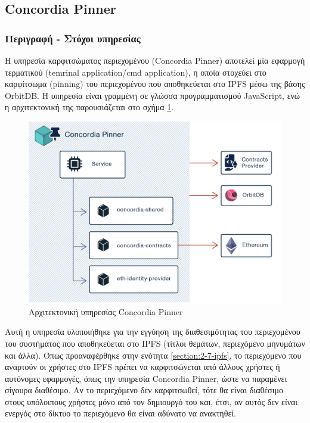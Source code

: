 \subsection{Concordia Pinner} \label{subsection:4-3-4-concordia-pinner-service}

\subsubsection{Περιγραφή - Στόχοι υπηρεσίας}

Η υπηρεσία καρφιτσώματος περιεχομένου (Concordia Pinner) αποτελεί μία εφαρμογή τερματικού (temrinal application/cmd application), η οποία στοχεύει στο καρφίτσωμα (pinning) του περιεχομένου που αποθηκεύεται στο IPFS μέσω της βάσης OrbitDB. Η υπηρεσία είναι γραμμένη σε γλώσσα προγραμματισμού JavaScript, ενώ η αρχιτεκτονική της παρουσιάζεται στο σχήμα \ref{figure:4-3-concordia-pinner-architecture}.

\vspace{.5\baselineskip}

\begin{figure}[H]
    \centering
    \includegraphics[width=.75\textwidth]{assets/figures/chapter-4/4.3.architecture-4.3.4.concordia-pinner-architecture.png}
    \caption{Αρχιτεκτονική υπηρεσίας Concordia Pinner}
    \label{figure:4-3-concordia-pinner-architecture}
\end{figure}

Αυτή η υπηρεσία υλοποιήθηκε για την εγγύηση της διαθεσιμότητας του περιεχομένου του συστήματος που αποθηκεύεται στο IPFS (τίτλοι θεμάτων, περιεχόμενο μηνυμάτων και άλλα). Όπως προαναφέρθηκε στην ενότητα \ref{section:2-7-ipfs}, το περιεχόμενο που αναρτούν οι χρήστες στο IPFS πρέπει να καρφιτσώνεται από άλλους χρήστες ή αυτόνομες εφαρμογές, όπως την υπηρεσία Concordia Pinner, ώστε να παραμένει σίγουρα διαθέσιμο. Αν το περιεχόμενο δεν καρφιτσωθεί, τότε θα είναι διαθέσιμο στους υπόλοιπους χρήστες μόνο από
τον δημιουργό του και, έτσι, αν αυτός δεν είναι ενεργός στο δίκτυο το περιεχόμενο θα είναι αδύνατο να ανακτηθεί.

